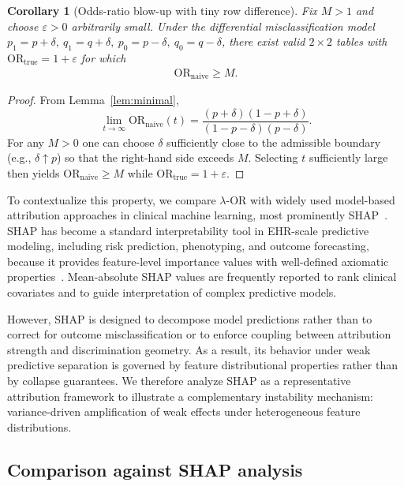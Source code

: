 \documentclass[pdflatex,sn-mathphys-num]{sn-jnl}%
\def\EQSP{3pt}
\newcommand{\cgather}[2][\EQSP]{\begingroup\setlength\abovedisplayskip{#1}\setlength\belowdisplayskip{#1}\begin{gather} #2 \end{gather}\endgroup\noindent}
\theoremstyle{thmstyleone}%
\newtheorem{corollary}[theorem]{Corollary} %
\theoremstyle{thmstyletwo}%
\theoremstyle{thmstylethree}%
\begin{document}
\begin{corollary}[Odds-ratio blow-up with tiny row difference]\label{corshap}
Fix $M>1$ and choose $\varepsilon>0$ arbitrarily small.
Under the differential misclassification model
$p_1=p+\delta,\ q_1=q+\delta,\ p_0=p-\delta,\ q_0=q-\delta$,
there exist valid $2\times2$ tables with $\mathrm{OR}_{\mathrm{true}}=1+\varepsilon$
for which
\cgather{
\mathrm{OR}_{\mathrm{naive}} \ge M .
}
\end{corollary}

\begin{proof}
From Lemma~\ref{lem:minimal},
\[
\lim_{t\to\infty}\mathrm{OR}_{\text{naive}}(t)
=
\frac{(p+\delta)(1-p+\delta)}{(1-p-\delta)(p-\delta)} .
\]
For any $M>0$ one can choose $\delta$ sufficiently close to the admissible
boundary (e.g., $\delta \uparrow p$) so that the right-hand side exceeds $M$.
Selecting $t$ sufficiently large then yields
$\mathrm{OR}_{\text{naive}}\ge M$ while $\mathrm{OR}_{\mathrm{true}}=1+\varepsilon$.
\end{proof}






To contextualize this property, we compare $\lambda$-OR with widely used 
model-based attribution approaches in clinical machine learning, 
most prominently SHAP~\cite{lundberg17shap}. 
SHAP has become a standard interpretability tool in EHR-scale predictive modeling, 
including risk prediction, phenotyping, and outcome forecasting, 
because it provides feature-level importance values with well-defined axiomatic properties~\cite{lundberg17shap,choi2016retain}. 
Mean-absolute SHAP values are frequently reported to rank clinical covariates 
and to guide interpretation of complex predictive models.

However, SHAP is designed to decompose model predictions rather than 
to correct for outcome misclassification or to enforce coupling between 
attribution strength and discrimination geometry. 
As a result, its behavior under weak predictive separation is governed 
by feature distributional properties rather than by collapse guarantees. 
We therefore analyze SHAP as a representative attribution framework 
to illustrate a complementary instability mechanism: 
variance-driven amplification of weak effects under heterogeneous feature distributions.


\subsection{Comparison against SHAP analysis}
\end{document}
